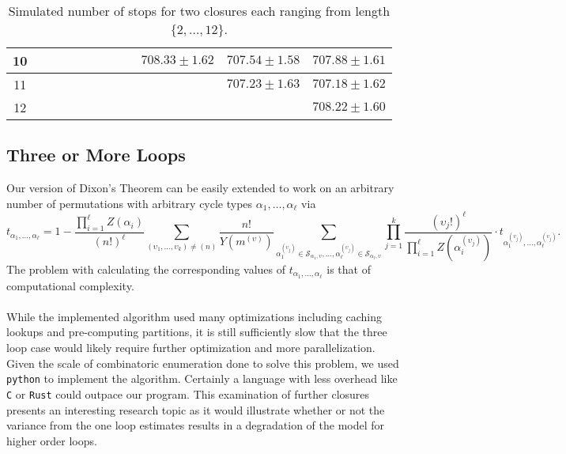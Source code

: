 \begin{table}[H]
\begin{adjustbox}{max width=\textwidth,max height=2\textheight}
\begin{tabular}{|c|c|c|c|c|c|c|c|c|c|c|c|}
      \hline
      10 & & & & & & & & & $708.33 \pm 1.62$ & $707.54 \pm 1.58$ &
      $707.88 \pm 1.61$ \\
      \hline
      11 & & & & & & & & & & $707.23 \pm 1.63$ & $707.18 \pm 1.62$ \\
      \hline
      12 & & & & & & & & & & & $708.22 \pm 1.60$ \\
      \hline
    \end{tabular}
  \end{adjustbox}
  \caption{Simulated number of stops for two closures each ranging
  from length $\{2,\dots,12\}$.}
  \label{fig:simulated_two_loop}
\end{table}

\subsection{Three or More Loops}
Our version of Dixon's Theorem can be easily extended to work on an
arbitrary number of permutations with arbitrary cycle types
$\alpha_1,\dots,\alpha_\ell$ via
\[
  t_{\alpha_1, \dots, \alpha_\ell} = 1 - \frac{\prod_{i=1}^\ell
  Z(\alpha_i)}{(n!)^\ell} \sum_{(\upsilon_1,\dots,\upsilon_k)\ne(n)}
  \frac{n!}{Y(m^{(\upsilon)})} \sum_{\alpha_1^{(\upsilon_j)} \in
    \mathcal{S}_{\alpha_1, \upsilon},\dots,\alpha_\ell^{(\upsilon_j)}
  \in \mathcal{S}_{\alpha_\ell, \upsilon}} \prod_{j=1}^k
  \frac{(\upsilon_j!)^\ell}{\prod_{i=1}^\ell
  Z(\alpha_i^{(\upsilon_j)})} \cdot t_{\alpha_1^{(\upsilon_j)},
  \dots, \alpha_\ell^{(\upsilon_j)}}.
\]
The
problem with calculating the corresponding values of
$t_{\alpha_1,\dots,\alpha_\ell}$ is that of computational complexity.
\\\\While the implemented algorithm used many optimizations including
caching lookups and pre-computing partitions, it is still sufficiently
slow that the three loop case would likely require further
optimization and more parallelization. Given the scale of
combinatoric enumeration done to solve this problem, we used
\texttt{python} to implement the algorithm. Certainly a language with
less overhead like \texttt{C} or \texttt{Rust} could outpace our
program. This examination of further closures presents an interesting
research topic as it would illustrate whether or not the variance
from the one loop estimates results in a degradation of the model for
higher order loops.
